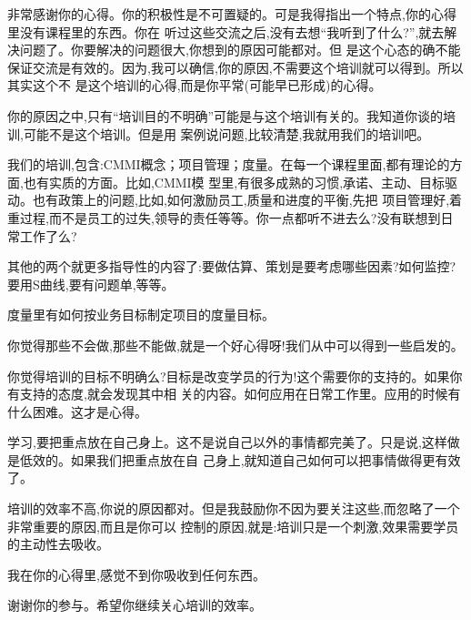 \documentclass[11pt]{article}
\begin{document}
\begin{yang}

  \ylogo 非常感谢你的心得。你的积极性是不可置疑的。可是我得指出一个特点,你的心得里没有课程里的东西。你在
  听过这些交流之后,没有去想``我听到了什么?'',就去解决问题了。你要解决的问题很大,你想到的原因可能都对。但
  是这个心态的确不能保证交流是有效的。因为,我可以确信,你的原因,不需要这个培训就可以得到。所以其实这个不
  是这个培训的心得,而是你平常(可能早已形成)的心得。

  你的原因之中,只有``培训目的不明确''可能是与这个培训有关的。我知道你谈的培训,可能不是这个培训。但是用
  案例说问题,比较清楚,我就用我们的培训吧。

  我们的培训,包含:CMMI概念；项目管理；度量。在每一个课程里面,都有理论的方面,也有实质的方面。比如,CMMI模
  型里,有很多成熟的习惯,承诺、主动、目标驱动。也有政策上的问题,比如,如何激励员工,质量和进度的平衡,先把
  项目管理好,着重过程,而不是员工的过失,领导的责任等等。你一点都听不进去么?没有联想到日常工作了么?

  其他的两个就更多指导性的内容了:要做估算、策划是要考虑哪些因素?如何监控?要用S曲线,要有问题单,等等。

  度量里有如何按业务目标制定项目的度量目标。

  你觉得那些不会做,那些不能做,就是一个好心得呀!我们从中可以得到一些启发的。

  你觉得培训的目标不明确么?目标是改变学员的行为!这个需要你的支持的。如果你有支持的态度,就会发现其中相
  关的内容。如何应用在日常工作里。应用的时候有什么困难。这才是心得。

  学习,要把重点放在自己身上。这不是说自己以外的事情都完美了。只是说,这样做是低效的。如果我们把重点放在自
  己身上,就知道自己如何可以把事情做得更有效了。

  培训的效率不高,你说的原因都对。但是我鼓励你不因为要关注这些,而忽略了一个非常重要的原因,而且是你可以
  控制的原因,就是:培训只是一个刺激,效果需要学员的主动性去吸收。

  我在你的心得里,感觉不到你吸收到任何东西。

  谢谢你的参与。希望你继续关心培训的效率。

\end{yang}
\end{document}
